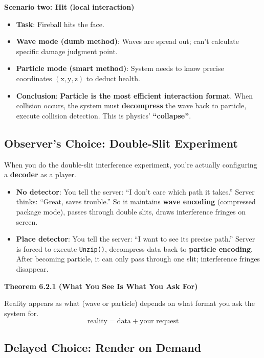 \textbf{Scenario two: Hit (local interaction)}
\begin{itemize}
\item \textbf{Task}: Fireball hits the face.
\item \textbf{Wave mode (dumb method)}: Waves are spread out; can't calculate specific damage judgment point.
\item \textbf{Particle mode (smart method)}: System needs to know precise coordinates $(\text{x}, \text{y}, \text{z})$ to deduct health.
\item \textbf{Conclusion}: \textbf{Particle is the most efficient interaction format}. When collision occurs, the system must \textbf{decompress} the wave back to particle, execute collision detection. This is physics' \textbf{``collapse''}.
\end{itemize}

\subsection{Observer's Choice: Double-Slit Experiment}

When you do the double-slit interference experiment, you're actually configuring a \textbf{decoder} as a player.

\begin{itemize}
\item \textbf{No detector}: You tell the server: ``I don't care which path it takes.'' Server thinks: ``Great, saves trouble.'' So it maintains \textbf{wave encoding} (compressed package mode), passes through double slits, draws interference fringes on screen.
\item \textbf{Place detector}: You tell the server: ``I want to see its precise path.'' Server is forced to execute \texttt{Unzip()}, decompress data back to \textbf{particle encoding}. After becoming particle, it can only pass through one slit; interference fringes disappear.
\end{itemize}

\textbf{Theorem 6.2.1 (What You See Is What You Ask For)}

Reality appears as what (wave or particle) depends on what format you ask the system for.
\[
\text{reality} = \text{data} + \text{your request}
\]

\subsection{Delayed Choice: Render on Demand}

